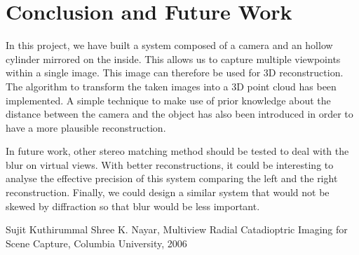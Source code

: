 \documentclass[a4paper,twocolumn,fleqn]{article}
\begin{document}
\section{Conclusion and Future Work}
In this project, we have built a system composed of a camera and an hollow cylinder mirrored on the inside. This allows us to capture multiple viewpoints within a single image. This image can therefore be used for 3D reconstruction. The algorithm to transform the taken images into a 3D point cloud has been implemented. A simple technique to make use of prior knowledge about the distance between the camera and the object has also been introduced in order to have a more plausible reconstruction.

In future work, other stereo matching method should be tested to deal with the blur on virtual views. With better reconstructions, it could be interesting to analyse the effective precision of this system comparing the left and the right reconstruction. Finally, we could design a similar system that would not be skewed by diffraction so that blur would be less important.

\small
\begin{thebibliography}{9}
Sujit Kuthirummal Shree K. Nayar, Multiview Radial Catadioptric Imaging for Scene Capture, Columbia University, 2006
\end{thebibliography}
\end{document}
